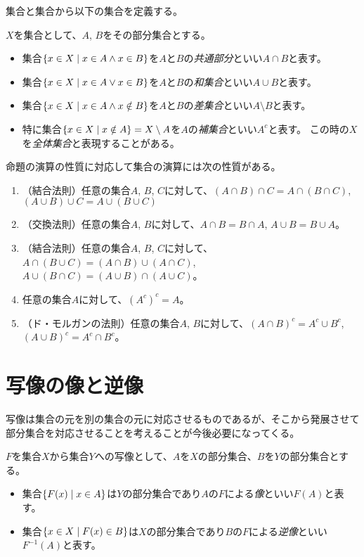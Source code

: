 集合と集合から以下の集合を定義する。

\begin{definition}[集合の演算]
$X$を集合として、$A$, $B$をその部分集合とする。
\begin{itemize}
\item
集合$\{ x \in X \mid x \in A \land x \in B \}$を$A$と$B$の\emph{共通部分}といい$A\cap B$と表す。
\item
集合$\{ x \in X \mid x \in A \lor x \in B \}$を$A$と$B$の\emph{和集合}といい$A\cup B$と表す。
\item
集合$\{ x \in X \mid x \in A \land x \notin B \}$を$A$と$B$の\emph{差集合}といい$A\setminus B$と表す。
\item
特に集合$\{ x \in X \mid x \notin A \} = X\setminus A$を$A$の\emph{補集合}といい$A^c$と表す。
この時の$X$を\emph{全体集合}と表現することがある。
\end{itemize}
\end{definition}

命題の演算の性質に対応して集合の演算には次の性質がある。
\begin{enumerate}
\item
（結合法則）任意の集合$A$, $B$, $C$に対して、$(A\cap B)\cap C = A\cap (B\cap C)$, $(A\cup B)\cup C = A\cup (B\cup C)$
\item
（交換法則）任意の集合$A$, $B$に対して、$A\cap B = B\cap A$, $A\cup B = B\cup A$。
\item
（結合法則）任意の集合$A$, $B$, $C$に対して、$A\cap(B\cup C) = (A\cap B)\cup(A\cap C)$, $A\cup(B\cap C) = (A\cup B)\cap(A\cup C)$。
\item
任意の集合$A$に対して、$(A^c)^c = A$。
\item
（ド・モルガンの法則）任意の集合$A$, $B$に対して、$(A\cap B)^c = A^c\cup B^c$, $(A\cup B)^c = A^c\cap B^c$。
\end{enumerate}

\section{写像の像と逆像}

写像は集合の元を別の集合の元に対応させるものであるが、そこから発展させて部分集合を対応させることを考えることが今後必要になってくる。

\begin{definition}[写像の像と逆像]
$F$を集合$X$から集合$Y$への写像として、$A$を$X$の部分集合、$B$を$Y$の部分集合とする。
\begin{itemize}
\item
集合$\{ F(x) \mid x \in A \}$は$Y$の部分集合であり$A$の$F$による\emph{像}といい$F(A)$と表す。
\item
集合$\{ x \in X \mid F(x) \in B \}$は$X$の部分集合であり$B$の$F$による\emph{逆像}といい$F^{-1}(A)$と表す。
\end{itemize}
\end{definition}

